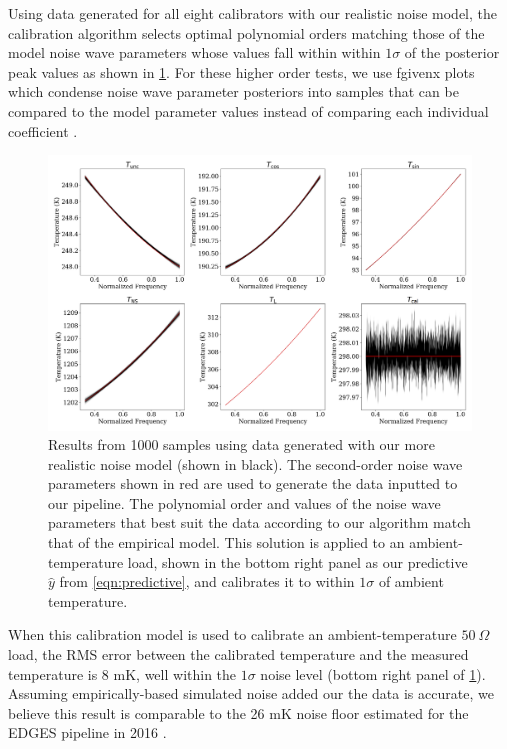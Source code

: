 Using data generated for all eight calibrators with our realistic noise model, the calibration algorithm selects optimal polynomial orders matching those of the model noise wave parameters whose values fall within within $1\sigma$ of the posterior peak values as shown in \cref{fig:fgxSamples}. For these higher order tests, we use fgivenx plots which condense noise wave parameter posteriors into samples that can be compared to the model parameter values instead of comparing each individual coefficient \citep{fgx}.
\begin{figure}
    \centering
    \includegraphics[width=\textwidth]{fgxSamples}
    \caption{Results from 1000 samples using data generated with our more realistic noise model (shown in black). The second-order noise wave parameters shown in red are used to generate the data inputted to our pipeline. The polynomial order and values of the noise wave parameters that best suit the data according to our algorithm match that of the empirical model. This solution is applied to an ambient-temperature load, shown in the bottom right panel as our predictive $\hat{y}$ from \cref{eqn:predictive}, and calibrates it to within $1\sigma$ of ambient temperature. \label{fig:fgxSamples}}
\end{figure}

When this calibration model is used to calibrate an ambient-temperature $50 \ \Omega$ load, the RMS error between the calibrated temperature and the measured temperature is 8 mK, well within the $1\sigma$ noise level (bottom right panel of \cref{fig:fgxSamples}). Assuming empirically-based simulated noise added our the data is accurate, we believe this result is comparable to the 26 mK noise floor estimated for the EDGES pipeline in 2016 \citep{edgesCal}.


